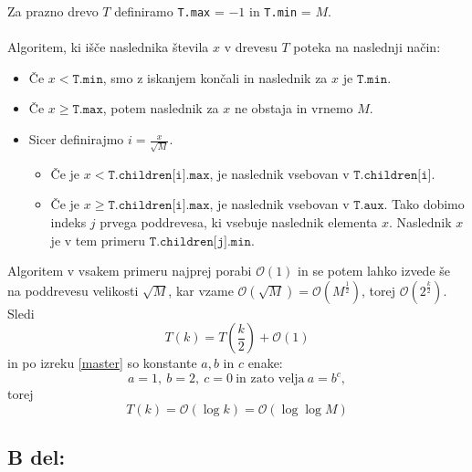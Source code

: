 \documentclass[a4paper,11pt]{article}
\begin{document}
\noindent
Za prazno drevo $T$ definiramo \texttt{T.max} = $- 1$ in \texttt{T.min} = $M$.
\\
\\
Algoritem, ki išče naslednika števila $x$ v drevesu $T$ poteka na naslednji način:
\begin{itemize}

    \item Če $x < \texttt{T.min}$, smo z iskanjem končali in naslednik za $x$ je $\texttt{T.min}$.
    \item Če $x \geq \texttt{T.max}$, potem naslednik za $x$ ne obstaja in vrnemo $M$.
    \item Sicer definirajmo $i = \frac{x}{\sqrt{M}}$.

        \begin{itemize}
            \item Če je $x < \texttt{T.children[i].max}$, je naslednik vsebovan v $\texttt{T.children[i]}$.
            \item Če je $x \geq \texttt{T.children[i].max}$, je naslednik vsebovan v $\texttt{T.aux}$. Tako dobimo indeks $j$ prvega poddrevesa, ki vsebuje naslednik elementa $x$. Naslednik $x$ je v tem primeru $\texttt{T.children[j].min}$.
        \end{itemize}

\end{itemize}

\noindent
Algoritem v vsakem primeru najprej porabi $\mathcal{O}(1)$ in se potem lahko izvede še na poddrevesu velikosti $\sqrt{M}$, kar vzame $\mathcal{O}(\sqrt{M}) = \mathcal{O} \left( M^{\frac{1}{2}} \right)$, 
torej $\mathcal{O} \left( 2^{\frac{k}{2}} \right)$.
\\
Sledi
$$
T(k) = T \left( \frac{k}{2} \right) + \mathcal{O}(1)
$$
in po izreku \ref{master} so konstante $a, b$ in $c$ enake: 
$$ a = 1, \  b = 2, \ c = 0  \ \text{in zato velja} \ a = b^c,$$
torej
$$
T(k) = \mathcal{O}(\log k) = \mathcal{O}(\log \log M)
$$


\subsection*{B del:}
\end{document}
